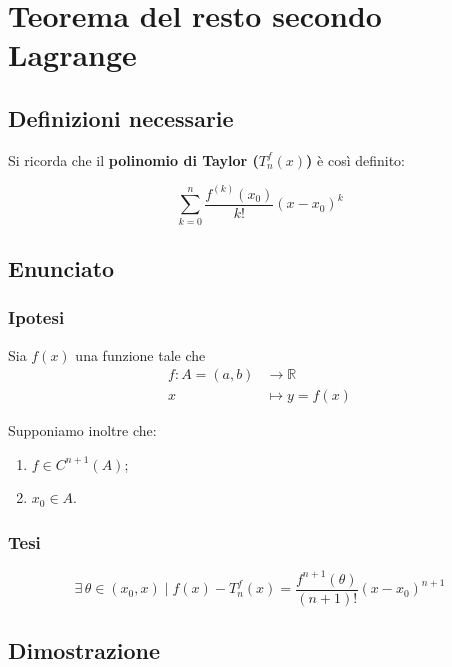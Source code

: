 \documentclass[../dimostrazioni]{subfiles}
\begin{document}
    \chapter{Teorema del resto secondo Lagrange}
    \label{teorestoLagrange}

        \section*{Definizioni necessarie}

            Si ricorda che il \textbf{polinomio di Taylor (\(T _n ^ f (x) \))} è così definito:

            \[ \sum_{k = 0}^{n} \frac{f^{(k)} (x_0)}{k!}(x-x_0)^k\]

        \section*{Enunciato}

            \subsection*{Ipotesi}

                Sia \(f(x)\) una funzione tale che
                \begin{align*}
                    f : A = (a, b) &\longrightarrow \mathbb{R}\\
                    x &\longmapsto y = f(x) 
                \end{align*}

                Supponiamo inoltre che:

                \begin{enumerate}
                    \indentitem \item \(f \in C^{n+1} (A) \);
                    \indentitem \item \(x_0 \in A\).
                \end{enumerate}

            \subsection*{Tesi}

                \[  \exists \, \theta \in (x_0, x) \; | \; f(x) - T _n ^ f (x) = \frac{f^{n+1}(\theta)}{(n+1)!}(x-x_0)^{n+1} \]

        \section*{Dimostrazione}
\end{document}
